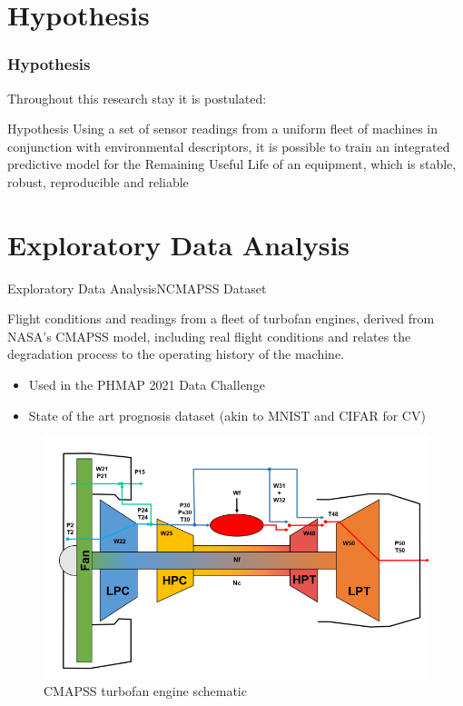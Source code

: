 \documentclass{beamer}
\begin{document}
    \section{Hypothesis}

        \begin{frame}
            \frametitle{Hypothesis}
            Throughout this research stay it is postulated:
            \begin{exampleblock}{Hypothesis}
                Using a set of sensor readings from a uniform fleet of machines in conjunction with environmental descriptors, it is possible to train an integrated predictive model for the Remaining Useful Life of an equipment, which is stable, robust, reproducible and reliable
            \end{exampleblock}
        \end{frame}

    \section{Exploratory Data Analysis}

        \begin{frame}{Exploratory Data Analysis}{NCMAPSS Dataset}

            Flight conditions and readings from a fleet of turbofan engines,
            derived from NASA's CMAPSS model, including real flight conditions and relates the degradation process to the operating history of the machine. \cite{arias2021aircraft}
            \begin{itemize}
                \item Used in the PHMAP 2021 Data Challenge \cite{phm-conference}
                \item State of the art prognosis dataset (akin to MNIST and CIFAR for CV)
            \end{itemize}

            \begin{figure}[!htbp]
                \centering
                \includegraphics[scale=0.35]{cmapss_turbofan.png}
                \caption{CMAPSS turbofan engine schematic}
            \end{figure}
        \end{frame}
\end{document}
